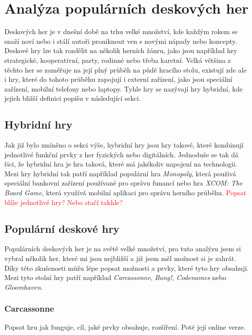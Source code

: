 \section{Analýza populárních deskových her}
\label{sec:popular-board-games-analysis}
Deskových her je v dnešní době na trhu velké množství, kde každým rokem se snaží noví nebo i stálí autoři proniknout ven s novými nápady nebo koncepty. Deskové hry lze tak rozdělit na několik herních žánru, jako jsou například hry strategické, kooperativní, party, rodinné nebo třeba karetní. Velká většina z těchto her se zaměřuje na její plný průběh na půdě hracího stolu, existují zde ale i hry, které do tohoto průběhu zapojují i externí zařízení, jako jsou speciální zařízení, mobilní telefony nebo laptopy. Tyhle hry se nazývají hry hybridní, kde jejich bližší definici popíšu v následující sekci.

\subsection*{Hybridní hry}
\label{subsec:popular-board-games-analysis-hybrid-games}
Jak již bylo zmíněno o sekci výše, hybridní hry jsou hry takové, které kombinují jednotlivé funkční prvky z her fyzických nebo digitálních. Jednoduše se tak dá řici, že hybridní hra je hra taková, které má jakékoliv napojení na technologii. Mezi hry hybridní tak patří například populární hra \textit{Monopoly}, která použivá speciální bankovní zařízení používané pro správu funancí nebo hra \textit{XCOM: The Board Game}, která využívá mobilní aplikaci pro správu herního průběhu.
\textcolor{red}{Popsat blíže jednotlivé hry? Nebo stačí takhle?}

\subsection{Populární deskové hry}
\label{subsec:popular-board-games-analysis-popular-games}
Populárních deskových her je na světě velké množství, pro tuto analýzu jsem si vybral několik her, které mi jsou nejbližší a již jsem měl možnost si je zahrát. Díky této zkušenosti můžu lépe popsat možnosti a prvky, které tyto hry obsahují. Mezi tyto stolní hry patří například \textit{Carcassonne}, \textit{Bang!}, \textit{Codenames} nebo \textit{Gloomhaven}.

\subsubsection{Carcassonne}
\label{subsubsec:popular-board-games-analysis-carcassonne}
Popsat hru jak funguje, cíl, jaké prvky obsahuje, rozšíření. Poté její online verze.

